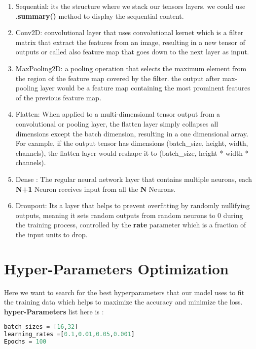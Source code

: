 \documentclass[12pt,a4paper]{article}
\begin{document}
\begin{enumerate}
\item Sequential: its the structure where we stack our tensors layers. we could use \textbf{.summary()} method to display the sequential content.
\item Conv2D: convolutional layer that uses convolutional kernet which is a filter matrix that extract the features from an image, resulting in a new tensor of outputs or called also feature map that goes down to the next layer as input.
\item MaxPooling2D: a pooling operation that selects the maximum element from the region of the feature map covered by the filter. the output after max-pooling layer would be a feature map containing the most prominent features of the previous feature map.
\item Flatten: When applied to a multi-dimensional tensor output from a convolutional or pooling layer, the flatten layer simply collapses all dimensions except the batch dimension, resulting in a one dimensional array. For example, if the output tensor has dimensions (batch\_size, height, width, channels), the flatten layer would reshape it to (batch\_size, height * width * channels).
\item Dense : The regular neural network layer that contains multiple neurons, each \textbf{N+1} Neuron receives input from all the \textbf{N} Neurons.
\item Droupout: Its a layer that helps to prevent overfitting by randomly nullifying outputs, meaning it sets random outputs from random neurons to 0 during the training process, controlled by the \textbf{rate} parameter which is a fraction of the input units to drop.
\end{enumerate}

\section{Hyper-Parameters Optimization}
Here we want to search for the best hyperparameters that our model uses to fit the training data which helps to maximize the accuracy and minimize the loss.\\
\textbf{hyper-Parameters} list here is :
\begin{lstlisting}[language=Python]
batch_sizes = [16,32]
learning_rates =[0.1,0.01,0.05,0.001]
Epochs = 100
\end{lstlisting}
\end{document}
